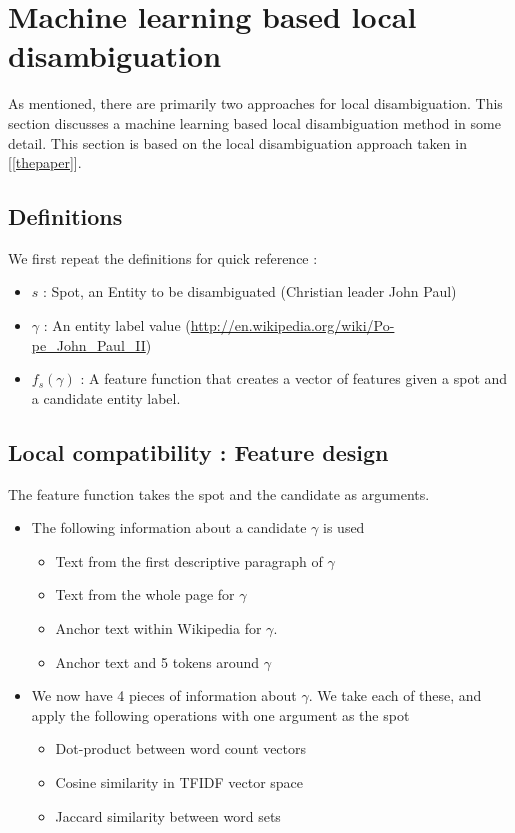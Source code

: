 \section{Machine learning based local disambiguation}
As mentioned, there are primarily two approaches for local disambiguation.
This section discusses a machine learning based local disambiguation method in some detail. This section
is based on the local disambiguation approach taken in [\ref{thepaper}].
\subsection{Definitions}
We first repeat the definitions for quick reference : 
\begin{itemize}
  \item $s$ : Spot, an Entity to be disambiguated (Christian leader John Paul) \bigskip 
  \item $\gamma$ : An entity label value (\url{http://en.wikipedia.org/wiki/Po-pe_John_Paul_II})  \bigskip 
 \item $f_s(\gamma)$ : A feature function that creates a vector of features given a spot and a candidate entity label.
 \end{itemize}
 
 \subsection{Local compatibility : Feature design} 
 The feature function takes the spot and the candidate as arguments. 
 
\begin{itemize} 
 
 \item The following information about a candidate $\gamma$ is used
\begin{itemize} 
 \item Text from the first descriptive paragraph of $\gamma$
  \item Text from the whole page for $\gamma$
  \item Anchor text within Wikipedia for $\gamma$.
  \item Anchor text and 5 tokens around $\gamma$ 
 \end{itemize}
 
 \item We now have 4 pieces of information about $\gamma$. We take each of these, and apply the following operations with 
 one argument as the spot
    \begin{itemize}
      \item{Dot-product between word count vectors}
      \item{Cosine similarity in TFIDF vector space}
      \item{Jaccard similarity between word sets}
  \end{itemize} 
  \end{itemize} 
 
